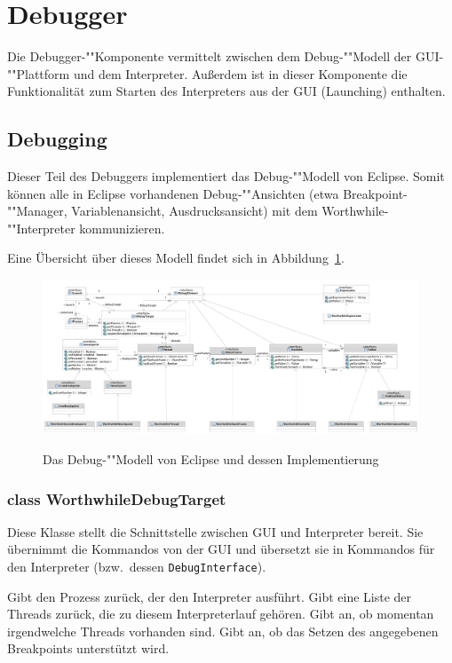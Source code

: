 \section{Debugger}

Die Debugger-""Komponente vermittelt zwischen dem Debug-""Modell der GUI-""Plattform und dem Interpreter. Außerdem ist in dieser Komponente die Funktionalität zum Starten des Interpreters aus der GUI (Launching) enthalten.

\subsection{Debugging}

Dieser Teil des Debuggers implementiert das Debug-""Modell von Eclipse. Somit können alle in Eclipse vorhandenen Debug-""Ansichten (etwa Breakpoint-""Manager, Variablenansicht, Ausdrucksansicht) mit dem Worthwhile-""Interpreter kommunizieren.

Eine Übersicht über dieses Modell findet sich in Abbildung~\ref{debugmodel}.

\begin{figure}
	\caption[B]{Das Debug-""Modell von Eclipse und dessen Implementierung\footnotemark}
	\centering
	\includegraphics[angle=90,height=\textheight]{diagrams/debugmodel.pdf}
	\label{debugmodel}
\end{figure}

\subsubsection{class WorthwhileDebugTarget}

Diese Klasse stellt die Schnittstelle zwischen GUI und Interpreter bereit. Sie übernimmt die Kommandos von der GUI und übersetzt sie in Kommandos für den Interpreter (bzw.\ dessen \texttt{DebugInterface}).

\begin{description}
	 Gibt den Prozess zurück, der den Interpreter ausführt.
	 Gibt eine Liste der Threads zurück, die zu diesem Interpreterlauf gehören.
	 Gibt an, ob momentan irgendwelche Threads vorhanden sind.
	 Gibt an, ob das Setzen des angegebenen Breakpoints unterstützt wird.
\end{description}

